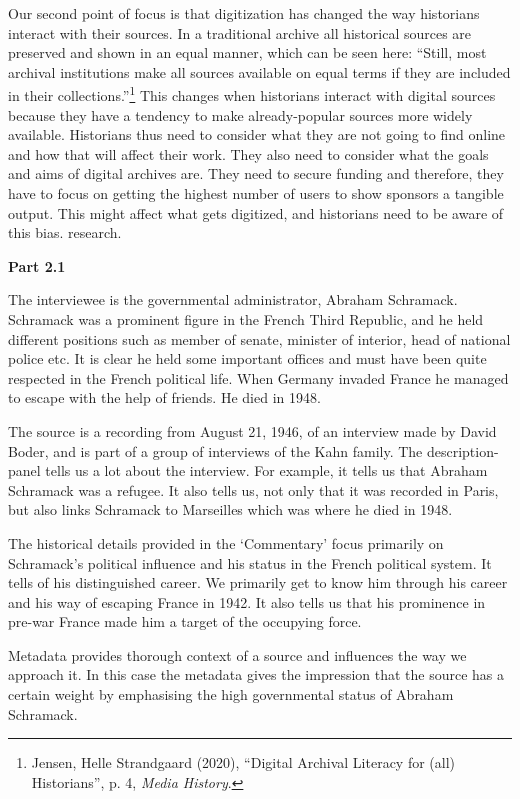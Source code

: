 \documentclass[%
  final,  %
  12pt,  %
  british,
  a4paper
]{article}
\begin{document}
Our second point of focus is that digitization has changed the way historians interact with their sources. In a traditional archive all historical sources are preserved and shown in an equal manner, which can be seen here: “Still, most archival institutions make all sources available on equal terms if they are included in their collections.”\footnote{Jensen, Helle Strandgaard (2020), “Digital Archival Literacy for (all) Historians”, p. 4,  \textit{Media History}.} This changes when historians interact with digital sources because they have a tendency to make already-popular sources more widely available. Historians thus need to consider what they are not going to find online and how that will affect their work. They also need to consider what the goals and aims of digital archives are. They need to secure funding and therefore, they have to focus on getting the highest number of users to show sponsors a tangible output. This might affect what gets digitized, and historians need to be aware of this bias.
research.\newline

\noindent\textbf{Part 2.1}

\noindent The interviewee is the governmental administrator, Abraham Schramack. Schramack was a prominent figure in the French Third Republic, and he held different positions such as member of senate, minister of interior, head of national police etc. It is clear he held some important offices and must have been quite respected in the French political life. When Germany invaded France he managed to escape with the help of friends. He died in 1948. 

The source is a recording from August 21, 1946, of an interview made by David Boder, and is part of a group of interviews of the Kahn family. The description-panel tells us a lot about the interview. For example, it tells us that Abraham Schramack was a refugee. It also tells us, not only that it was recorded in Paris, but also links Schramack to Marseilles which was where he died in 1948.

The historical details provided in the ‘Commentary’ focus primarily on Schramack's political influence and his status in the French political system. It tells of his distinguished career. We primarily get to know him through his career and his way of escaping France in 1942. It also tells us that his prominence in pre-war France made him a target of the occupying force. 

Metadata provides thorough context of a source and influences the way we approach it. In this case the metadata gives the impression that the source has a certain weight by emphasising the high governmental status of Abraham Schramack.
\newline
\end{document}
